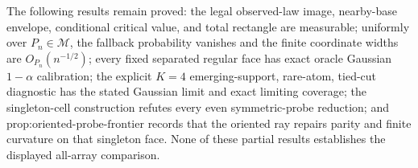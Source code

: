 The following results remain proved: the legal observed-law image, nearby-base envelope, conditional critical value, and total rectangle are measurable; uniformly over \(P_n\in\mathcal M\), the fallback probability vanishes and the finite coordinate widths are \(O_{P_n}(n^{-1/2})\); every fixed separated regular face has exact oracle Gaussian \(1-\alpha\) calibration; the explicit \(K=4\) emerging-support, rare-atom, tied-cut diagnostic has the stated Gaussian limit and exact limiting coverage; the singleton-cell construction refutes every even symmetric-probe reduction; and \(\text{prop:oriented-probe-frontier}\) records that the oriented ray repairs parity and finite curvature on that singleton face.  None of these partial results establishes the displayed all-array comparison.
